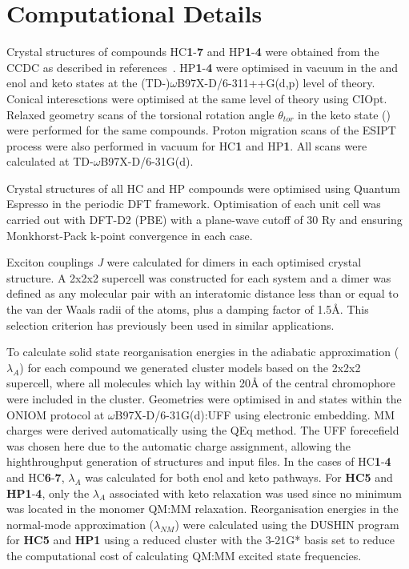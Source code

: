 \section{Computational Details}\label{section: Connecting_Comp}
Crystal structures of compounds \ac{HC}\textbf{1}-\textbf{7} and \ac{HP}\textbf{1}-\textbf{4} were obtained from the CCDC as described in references{~}. \ac{HP}\textbf{1}-\textbf{4} were optimised in vacuum in the \szero{} and \sone{} enol and keto states at the (TD-)$\omega$B97X-D/6-311++G(d,p) level of theory. Conical interesctions were optimised at the same level of theory using CIOpt. Relaxed geometry scans of the torsional rotation angle $\theta_{tor}$ in the keto \sone{} state (\Kstar) were performed for the same compounds. Proton migration scans of the ESIPT process were also performed in vacuum for \ac{HC}\textbf{1} and \ac{HP}\textbf{1}. All scans were calculated at TD-$\omega$B97X-D/6-31G(d). 

Crystal structures of all \ac{HC} and \ac{HP} compounds were optimised using Quantum Espresso in the periodic DFT framework.\cite{QE-2009} Optimisation of each unit cell was carried out with DFT-D2 (PBE) with a plane-wave cutoff of 30 Ry and ensuring Monkhorst-Pack k-point convergence in each case.

Exciton couplings \textit{J} were calculated for dimers in each optimised crystal structure. A 2x2x2 supercell was constructed for each system and a dimer was defined as any molecular pair with an interatomic distance less than or equal to the van der Waals radii of the atoms, plus a damping factor of 1.5\AA. This selection criterion has previously been used in similar applications.\cite{Campbell2017} 

To calculate solid state reorganisation energies in the adiabatic approximation ($\lambda_{A}$) for each compound we generated cluster models based on the 2x2x2 supercell, where all molecules which lay within 20{\AA} of the central chromophore were included in the cluster. Geometries were optimised in \sone{} and \szero{} states within the ONIOM protocol at $\omega$B97X-D/6-31G(d):UFF using electronic embedding. MM charges were derived automatically using the QEq method.\cite{Rappe2007} The UFF forecefield was chosen here due to the automatic charge assignment, allowing the highthroughput generation of structures and input files. In the cases of \ac{HC}\textbf{1}-\textbf{4} and \ac{HC}\textbf{6}-\textbf{7}, $\lambda_{A}$ was calculated for both enol and keto pathways. For \textbf{HC5} and \textbf{HP1}-\textbf{4}, only the $\lambda_{A}$ associated with keto relaxation was used since no \Estar{} minimum was located in the monomer QM:MM relaxation. Reorganisation energies in the normal-mode approximation ($\lambda_{NM}$) were calculated using the DUSHIN program for \textbf{HC5} and \textbf{HP1} using a reduced cluster with the 3-21G* basis set to reduce the computational cost of calculating QM:MM excited state frequencies.\cite{Reimers2001}

